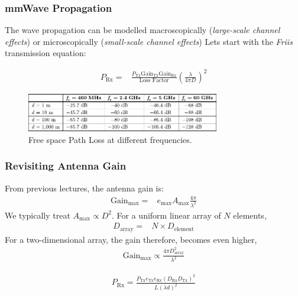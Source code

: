 \documentclass[10pt]{beamer}
\begin{document}
\begin{frame}
    \frametitle{mmWave Propagation}

    \begin{outline}
        \1 The wave propagation can be modelled macroscopically (\textit{large-scale channel effects}) or microscopically (\textit{small-scale channel effects})
        \1 Lets start with the \textit{Friis} transmission equation:
    \end{outline}

    \begin{align*}
        P_{\text{Rx}} {}= & \frac{P_{\text{Tx}} \mathrm{Gain}_{\text{Tx}}  \mathrm{Gain}_{\text{Rx}}}{\text{Loss Factor}} \left(\frac{\lambda}{4 \pi D}\right)^2
    \end{align*}

    \begin{figure}[h!]
        \centering
        \includegraphics[width=0.75\textwidth]{table.pdf}
        \caption{Free space Path Loss at different frequencies.}
    \end{figure}

\end{frame}



\begin{frame}
    \frametitle{Revisiting Antenna Gain}

    From previous lectures, the antenna gain is:
    \begin{align*}
        \mathrm{Gain}_{\max} {}= & e_{\max} A_{\max} \frac{4 \pi}{\lambda^{2}}
    \end{align*}
    We typically treat $A_{\max} \propto D^2$.    For a uniform linear array of $N$ elements,
    \begin{align*}
        D_{\text{array}} {}= & N \times D_{\text{element}}
    \end{align*}
    For a two-dimensional array, the gain therefore, becomes even higher,
    \begin{align*}
        \mathrm{Gain}_{\max} \propto \frac{4 \pi D_{\text{array}}^{2}}{\lambda^{2}}
    \end{align*}
    \begin{tcolorbox}[colback=blue!5]
        \begin{align*}
            P_{\text{Rx}}=\frac{P_{\text{Tx}} e_{\text{Tx}} e_{\text{Rx}}\left(D_{\text{Rx}} D_{\text{Tx}}\right)^{2}}{L(\lambda d)^{2}}
        \end{align*}
    \end{tcolorbox}
\end{frame}
\end{document}

